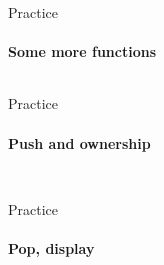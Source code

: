 \documentclass[usenames,dvipsnames,10pt,aspectratio=169]{beamer}
\begin{document}
\begin{frame}{Practice}
\framesubtitle{Some more functions}
\inputminted[fontsize=\normalsize]{rust}{code/list5.rs}
\end{frame}

\begin{frame}{Practice}
	\framesubtitle{Push and ownership}
\inputminted[fontsize=\normalsize]{rust}{code/list6.rs}
\vspace{0.5cm}
\inputminted[fontsize=\normalsize]{rust}{code/list7.rs}
\end{frame}

\begin{frame}{Practice}
	\framesubtitle{Pop, display}
\inputminted[fontsize=\footnotesize]{rust}{code/list8.rs}
\vspace{0.2cm}
\inputminted[fontsize=\footnotesize]{rust}{code/list9.rs}
\end{frame}
\end{document}
